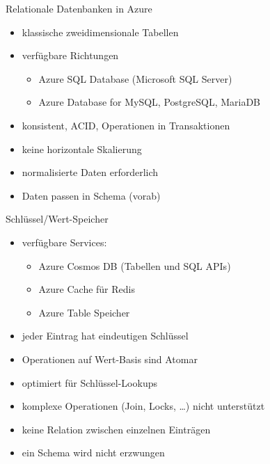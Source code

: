 \begin{flashcard}[Definition]{Relationale Datenbanken in Azure}
  \begin{itemize}
    \item klassische zweidimensionale Tabellen
    \item verfügbare Richtungen
      \begin{itemize}
        \item Azure SQL Database (Microsoft SQL Server)
        \item Azure Database for MySQL, PostgreSQL, MariaDB
      \end{itemize}
    \item konsistent, ACID, Operationen in Transaktionen
    \item keine horizontale Skalierung
    \item normalisierte Daten erforderlich
    \item Daten passen in Schema (vorab)
  \end{itemize}
\end{flashcard}

\begin{flashcard}[Definition]{Schlüssel/Wert-Speicher}
  \begin{itemize}
    \item verfügbare Services:
      \begin{itemize}
        \item Azure Cosmos DB (Tabellen und SQL APIs)
        \item Azure Cache für Redis
        \item Azure Table Speicher
      \end{itemize}
    \item jeder Eintrag hat eindeutigen Schlüssel
    \item Operationen auf Wert-Basis sind Atomar
    \item optimiert für Schlüssel-Lookups
    \item komplexe Operationen (Join, Locks, \ldots) nicht unterstützt
    \item keine Relation zwischen einzelnen Einträgen
    \item ein Schema wird nicht erzwungen
  \end{itemize}
\end{flashcard}

